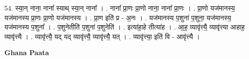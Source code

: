 \documentclass[17pt]{extarticle}
\begin{document}
54. स्या॒न् नाना॒ नाना᳚ स्याथ् स्या॒न् नाना᳚ । . नाना᳚ प्रा॒णः प्रा॒णो नाना॒ नाना᳚ प्रा॒णः । . प्रा॒णो यज॑मानस्य॒ यज॑मानस्य प्रा॒णः प्रा॒णो यज॑मानस्य । . प्रा॒ण इति॑ प्र - अ॒नः । . यज॑मानस्य प॒शुना॑ प॒शुना॒ यज॑मानस्य॒ यज॑मानस्य प॒शुना᳚ । . प॒शुनेतीति॑ प॒शुना॑ प॒शुनेति॑ । . इत्या॑हा॒हे तीत्या॑ह । . आ॒ह॒ व्यावृ॑त्त्यै॒ व्यावृ॑त्त्या आहाह॒ व्यावृ॑त्त्यै । . व्यावृ॑त्त्यै॒ यद् यद् व्यावृ॑त्त्यै॒ व्यावृ॑त्त्यै॒ यत् । . व्यावृ॑त्त्या॒ इति॑ वि - आवृ॑त्त्यै । \newline

\textbf{Ghana Paata } \newline
\end{document}
